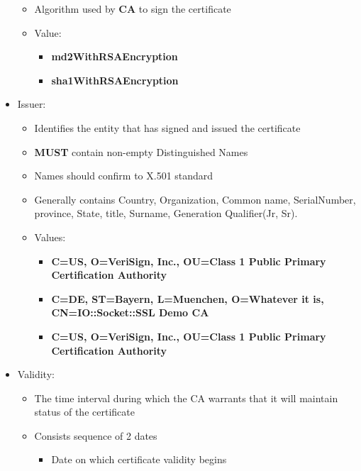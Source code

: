 \documentclass[a4paper]{article}
\begin{document}
\begin{itemize}
\begin{itemize}
                    \item Algorithm used by \textbf{CA} to sign the certificate
                    \item Value:
                        \begin{itemize}
                            \item \textbf{md2WithRSAEncryption}
                            \item \textbf{sha1WithRSAEncryption}
                        \end{itemize}
                \end{itemize}
            \item Issuer:
                \begin{itemize}
                    \item Identifies the entity that has signed and issued the certificate
                    \item \textbf{MUST} contain non-empty Distinguished Names
                    \item Names should confirm to X.501 standard
                    \item Generally contains Country, Organization, Common name, SerialNumber,
                        province, State, title, Surname, Generation Qualifier(Jr, Sr).
                    \item Values:
                    \begin{itemize}
                        \item \textbf{C=US, O=VeriSign, Inc., OU=Class 1 Public Primary Certification Authority}
                        \item \textbf{C=DE, ST=Bayern, L=Muenchen, O=Whatever it is, CN=IO::Socket::SSL Demo CA}
                        \item \textbf{C=US, O=VeriSign, Inc., OU=Class 1 Public Primary Certification Authority}
                    \end{itemize}
                \end{itemize}
            \item Validity:
                \begin{itemize}
                    \item The time interval during which the CA warrants that it will maintain status of the certificate
                    \item Consists sequence of 2 dates
                        \begin{itemize}
                            \item Date on which certificate validity begins

\end{itemize}
\end{itemize}
\end{itemize}
\end{document}
